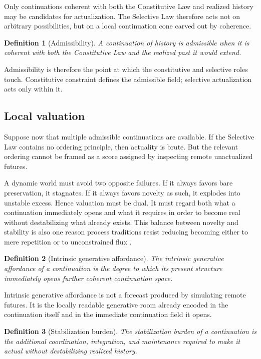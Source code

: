 \documentclass[11pt]{article}
\theoremstyle{foundation}
\newtheorem{definition}{Definition}
\begin{document}
Only continuations coherent with both the Constitutive Law and realized history may be candidates for actualization. The Selective Law therefore acts not on arbitrary possibilities, but on a local continuation cone carved out by coherence.

\begin{definition}[Admissibility]
A continuation of history is admissible when it is coherent with both the Constitutive Law and the realized past it would extend.
\end{definition}

Admissibility is therefore the point at which the constitutive and selective roles touch. Constitutive constraint defines the admissible field; selective actualization acts only within it.

\subsection{Local valuation}

Suppose now that multiple admissible continuations are available. If the Selective Law contains no ordering principle, then actuality is brute. But the relevant ordering cannot be framed as a score assigned by inspecting remote unactualized futures.

A dynamic world must avoid two opposite failures. If it always favors bare preservation, it stagnates. If it always favors novelty as such, it explodes into unstable excess. Hence valuation must be dual. It must regard both what a continuation immediately opens and what it requires in order to become real without destabilizing what already exists. This balance between novelty and stability is also one reason process traditions resist reducing becoming either to mere repetition or to unconstrained flux \citep{Whitehead1929,Rescher1996,Cartwright1999}.

\begin{definition}[Intrinsic generative affordance]
The intrinsic generative affordance of a continuation is the degree to which its present structure immediately opens further coherent continuation space.
\end{definition}

Intrinsic generative affordance is not a forecast produced by simulating remote futures. It is the locally readable generative room already encoded in the continuation itself and in the immediate continuation field it opens.

\begin{definition}[Stabilization burden]
The stabilization burden of a continuation is the additional coordination, integration, and maintenance required to make it actual without destabilizing realized history.
\end{definition}
\end{document}
